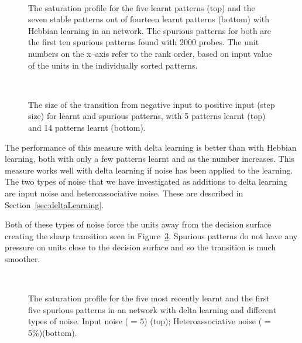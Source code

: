 \begin{figure}[p]
\small
\center
	\\
	\caption{The saturation profile for the five learnt patterns (top) and the seven stable patterns out of fourteen learnt patterns (bottom) with Hebbian learning in an  network.  The spurious patterns for both are the first ten spurious patterns found with 2000 probes. The unit numbers on the x--axis refer to the rank order, based on input value of the units in the individually sorted patterns.}
	\label{fig:SaturationProfile}
\end{figure}


\begin{figure}[p]
\center
\small
%	
	\vspace{1cm}\\
%	
	\caption{The size of the transition from negative input to positive input (step size) for learnt and spurious patterns, with 5 patterns learnt (top) and 14 patterns learnt (bottom).}
	\label{fig:SaturationProfileOverloadComp}
\end{figure}

The performance of this measure with delta learning is better than with Hebbian learning, both with only a few patterns learnt and as the number increases.  This measure works well with delta learning if noise has been applied to the learning. The two types of noise that we have investigated as additions to delta learning are input noise and heteroassociative noise.  These are described in Section~\ref{sec:deltaLearning}. 

Both of these types of noise force the units away from the decision surface creating the sharp transition seen in Figure~\ref{fig:SaturationProfileDelta}. Spurious patterns do not have any pressure on units close to the decision surface and so the transition is much smoother.


\begin{figure}[p]
\small
\center
%	
	\vspace{1cm}\\
%	
\caption{The saturation profile for the five most recently learnt and the first five spurious patterns in an  network with delta learning and different types of noise.  Input noise ( = $5$) (top); Heteroassociative noise ( = 5\%)(bottom).}
	\label{fig:SaturationProfileDelta}
\end{figure}


